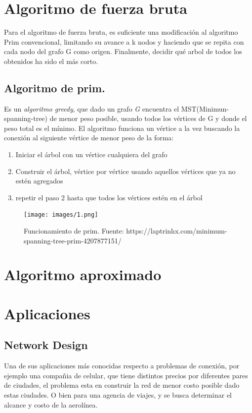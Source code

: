 \documentclass[spanish,12pt]{elsarticle}
\begin{document}
 
\section{Algoritmo de fuerza bruta}
Para el algoritmo de fuerza bruta, es suficiente una modificación al algoritmo Prim convencional, limitando su avance a k nodos y haciendo que se repita con cada nodo del grafo G como origen. Finalmente, decidir qué arbol de todos los obtenidos ha sido el más corto.
\clearpage
\subsection{Algoritmo de prim.}
Es un \textit{algoritmo greedy}, que dado un grafo \textit{G}  encuentra el MST(Minimun-spanning-tree) de menor peso posible, usando todos los vértices de G y donde el peso total es el mínimo. El algoritmo funciona un vértice a la vez buscando la conexión al siguiente vértice de menor peso de la forma:\\



\begin{enumerate}
    \item  Iniciar el árbol con un vértice cualquiera del grafo
    \item  Construir el árbol, vértice por vértice usando aquellos vértices que ya no estén agregados
    \item repetir el paso 2 hasta que todos los vértices estén en el árbol

\end{enumerate}

\begin{figure}[h]
    \centering
    \texttt{[image: images/1.png]}
    \caption{Funcionamiento de prim. Fuente: https://laptrinhx.com/minimum-spanning-tree-prim-4207877151/ }
    \label{fig:my_label}
\end{figure}
\clearpage




\section{Algoritmo aproximado}

\section{Aplicaciones}
\subsection{Network Design}
Una de sus aplicaciones más conocidas respecto a problemas de conexión, por ejemplo una compañia de celular, que tiene distintos precios por diferentes pares de ciudades, el problema esta en construir la red de menor costo posible dado estas ciudades. O bien para una agencia de viajes, y se busca determinar el alcance y costo de la aerolínea.
\end{document}
